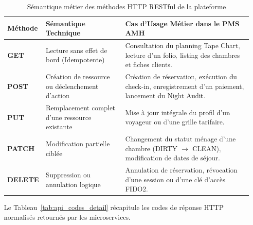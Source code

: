 \begin{table}[H]
\centering
\small
\renewcommand{\arraystretch}{1.3}
\begin{tabularx}{\textwidth}{|p{2.5cm}|p{4.5cm}|X|}
\hline
\textbf{Méthode} & \textbf{Sémantique Technique} & \textbf{Cas d'Usage Métier dans le PMS AMH} \\
\hline
\textbf{GET} & Lecture sans effet de bord (Idempotente) & Consultation du planning Tape Chart, lecture d'un folio, listing des chambres et fiches clients. \\
\hline
\textbf{POST} & Création de ressource ou déclenchement d'action & Création de réservation, exécution du check-in, enregistrement d'un paiement, lancement du Night Audit. \\
\hline
\textbf{PUT} & Remplacement complet d'une ressource existante & Mise à jour intégrale du profil d'un voyageur ou d'une grille tarifaire. \\
\hline
\textbf{PATCH} & Modification partielle ciblée & Changement du statut ménage d'une chambre (DIRTY $\rightarrow$ CLEAN), modification de dates de séjour. \\
\hline
\textbf{DELETE} & Suppression ou annulation logique & Annulation de réservation, révocation d'une session ou d'une clé d'accès FIDO2. \\
\hline
\end{tabularx}
\caption{Sémantique métier des méthodes HTTP RESTful de la plateforme}
\label{tab:api_verbs_detail}
\end{table}

Le Tableau~\ref{tab:api_codes_detail} récapitule les codes de réponse HTTP normalisés retournés par les microservices.

